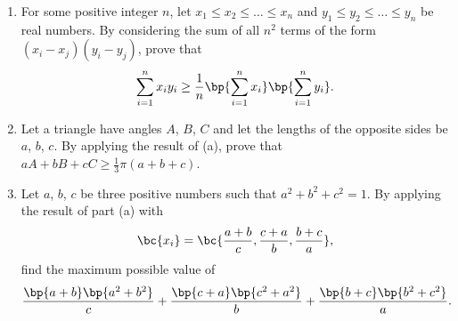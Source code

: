 \begin{problem}
    \begin{enumerate}
        \item For some positive integer $n$, let $x_1 \leq x_2 \leq \dots \leq x_n$ and $y_1 \leq y_2 \leq \dots \leq y_n$ be real numbers. By considering the sum of all $n^2$ terms of the form $(x_i - x_j)(y_i - y_j)$, prove that \[\sum_{i = 1}^n x_i y_i \geq \frac1n \bp{\sum_{i = 1}^n x_i} \bp{\sum_{i = 1}^n y_i}.\]
        \item Let a triangle have angles $A$, $B$, $C$ and let the lengths of the opposite sides be $a$, $b$, $c$. By applying the result of (a), prove that $aA + bB + cC \geq \frac13 \pi (a + b + c)$.
        \item Let $a$, $b$, $c$ be three positive numbers such that $a^2 + b^2 + c^2 = 1$. By applying the result of part (a) with \[\bc{x_i} = \bc{\frac{a+b}{c}, \frac{c+a}{b}, \frac{b+c}{a}},\] find the maximum possible value of \[\frac{\bp{a + b}\bp{a^2 + b^2}}{c} + \frac{\bp{c+a}\bp{c^2 + a^2}}{b} + \frac{\bp{b+c}\bp{b^2 + c^2}}{a}.\]
    \end{enumerate}
\end{problem}
